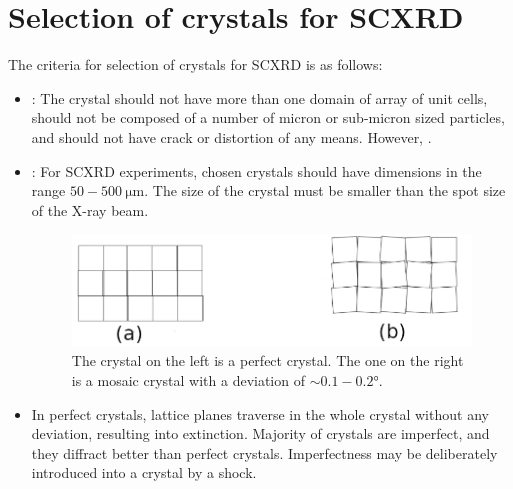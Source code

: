 \section{Selection of crystals for SCXRD}

	The criteria for selection of crystals for SCXRD is as follows:%
%			
		\begin{itemize}%
%			
		    \item {}: The crystal should not have more than one domain of array of unit cells, should not be composed of a number of micron or sub-micron sized particles, and should not have crack or distortion of any means. However, .
		    
		    \item {}: For SCXRD experiments, chosen crystals should have dimensions in the range $50-500~\si{\micro\metre}.$ The size of the crystal must be smaller than the spot size of the X-ray beam.
		    
		    \begin{figure}
		    	\centering
		    	\includegraphics[scale=0.5]{imperfect_crystal.png}
		    	\caption{\label{fig:imperfect_crystal}The crystal on the left is a perfect crystal. The one on the right is a mosaic crystal with a deviation of $\sim 0.1-0.2 \si{\degree}.$}
		    \end{figure}
		    
		    \item {} In perfect crystals, lattice planes traverse in the whole crystal without any deviation, resulting into extinction. Majority of crystals are imperfect, and they diffract better than perfect crystals. Imperfectness may be deliberately introduced into a crystal by a shock.
		    

\end{itemize}

